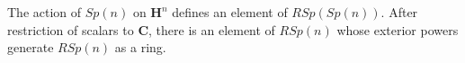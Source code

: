 The action of $Sp(n)$ on $\mathbf{H}^n$ defines an element of $RSp(Sp(n))$. After restriction of scalars to $\mathbf{C}$, there is an element of $RSp(n)$ whose exterior powers generate $RSp(n)$ as a ring.
